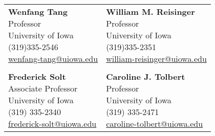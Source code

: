 \documentclass[10.5pt,]{article}
\begin{document}
\begin{tabular}{ll}
\parbox{5cm}{\textbf{Wenfang Tang}\\Professor\\University of Iowa\\(319)335-2546\\\href{mailto:wenfang-tang@uiowa.edu}{wenfang-tang@uiowa.edu}}
 &\parbox{5cm}{\textbf{William M. Reisinger}\\Professor\\University of Iowa\\(319)335-2351\\\href{mailto:william-reisinger@uiowa.edu}{william-reisinger@uiowa.edu}}\\
&\\
\parbox{5cm}{\textbf{Frederick Solt}\\Associate Professor\\University of Iowa\\(319) 335-2340\\\href{mailto:frederick-solt@uiowa.edu}{frederick-solt@uiowa.edu}}
 &\parbox{5cm}{\textbf{Caroline J. Tolbert}\\Professor\\University of Iowa\\(319) 335-2471\\\href{caroline-tolbert@uiowa.edu}{caroline-tolbert@uiowa.edu}}\\
\end{tabular}
\end{document}
